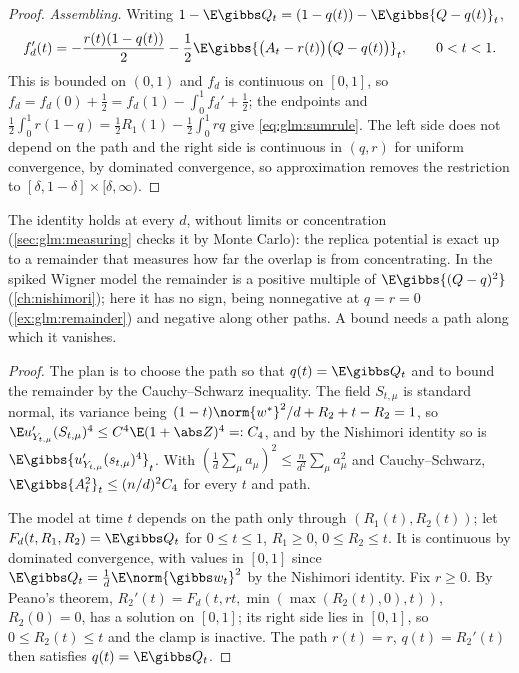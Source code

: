 \begin{refsection}
\begin{proof}
\emph{Assembling.} Writing $1-\E\gibbs Q_t=(1-q(t))-\E\gibbs{Q-q(t)}_t$,
\[
f_d'(t)=-\frac{r(t)(1-q(t))}2-\frac12\E\gibbs{\bigl(A_t-r(t)\bigr)\bigl(Q-q(t)\bigr)}_t,\qquad0<t<1.
\]
This is bounded on $(0,1)$ and $f_d$ is continuous on $[0,1]$, so $f_d=f_d(0)+\frac12=f_d(1)-\int_0^1f_d'+\frac12$; the endpoints and $\frac12\int_0^1r(1-q)=\frac12R_1(1)-\frac12\int_0^1rq$ give \eqref{eq:glm:sumrule}. The left side does not depend on the path and the right side is continuous in $(q,r)$ for uniform convergence, by dominated convergence, so approximation removes the restriction to $[\delta,1-\delta]\times[\delta,\infty)$.
\end{proof}

The identity holds at every $d$, without limits or concentration (\cref{sec:glm:measuring} checks it by Monte Carlo): the replica potential is exact up to a remainder that measures how far the overlap is from concentrating. In the spiked Wigner model the remainder is a positive multiple of $\E\gibbs{(Q-q)^2}$ (\cref{ch:nishimori}); here it has no sign, being nonnegative at $q=r=0$ (\cref{ex:glm:remainder}) and negative along other paths. A bound needs a path along which it vanishes.


\begin{proof}
The plan is to choose the path so that $q(t)=\E\gibbs Q_t$ and to bound the remainder by the Cauchy--Schwarz inequality. The field $S_{t,\mu}$ is standard normal, its variance being $(1-t)\norm{w^*}^2/d+R_2+t-R_2=1$, so $\E u'_{Y_{t,\mu}}(S_{t,\mu})^4\le C^4\E(1+\abs Z)^4=:C_4$, and by the Nishimori identity so is $\E\gibbs{u'_{Y_{t,\mu}}(s_{t,\mu})^4}_t$. With $(\frac1d\sum_\mu a_\mu)^2\le\frac n{d^2}\sum_\mu a_\mu^2$ and Cauchy--Schwarz, $\E\gibbs{A_t^2}_t\le(n/d)^2C_4$ for every $t$ and path.

The model at time $t$ depends on the path only through $(R_1(t),R_2(t))$; let $F_d(t,R_1,R_2)=\E\gibbs Q_t$ for $0\le t\le1$, $R_1\ge0$, $0\le R_2\le t$. It is continuous by dominated convergence, with values in $[0,1]$ since $\E\gibbs Q_t=\frac1d\E\norm{\gibbs w_t}^2$ by the Nishimori identity. Fix $r\ge0$. By Peano's theorem, $R_2'(t)=F_d(t,rt,\min(\max(R_2(t),0),t))$, $R_2(0)=0$, has a solution on $[0,1]$; its right side lies in $[0,1]$, so $0\le R_2(t)\le t$ and the clamp is inactive. The path $r(t)=r$, $q(t)=R_2'(t)$ then satisfies $q(t)=\E\gibbs Q_t$.


\end{proof}
\end{refsection}
